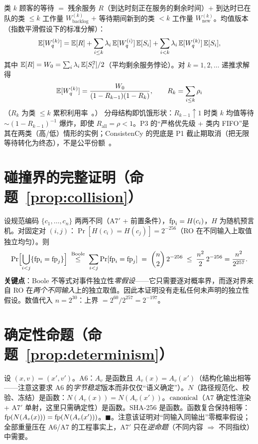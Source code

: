类 $k$ 顾客的等待 $=$ 残余服务 $R$（到达时刻正在服务的剩余时间）$+$ 到达时已在队的类 $\le k$ 工作量 $W_{\text{backlog}}^{(k)}$ $+$ 等待期间新到的类 $<k$ 工作量 $W_{\text{new}}^{(k)}$。均值版本（指数平滑假设下的标准分解）：
\begin{equation}
\operatorname{\mathbb{E}}[W_q^{(k)}]=\operatorname{\mathbb{E}}[R]+\sum_{i\le k}\lambda_i\operatorname{\mathbb{E}}[W_q^{(i)}]\operatorname{\mathbb{E}}[S_i]+\sum_{i<k}\lambda_i\operatorname{\mathbb{E}}[W_q^{(k)}]\operatorname{\mathbb{E}}[S_i],
\end{equation}
其中 $\operatorname{\mathbb{E}}[R]=W_0=\sum_i\lambda_i\operatorname{\mathbb{E}}[S_i^2]/2$（平均剩余服务悖论）。对 $k=1,2,\dots$ 递推求解得
\begin{equation}
\operatorname{\mathbb{E}}[W_q^{(k)}]=\frac{W_0}{(1-R_{k-1})(1-R_k)},\qquad R_k=\sum_{i\le k}\rho_i
\end{equation}
（$R_k$ 为类 $\le k$ 累积利用率~\cite{kleinrock1975}。）
分母结构即饥饿形状：$R_{k-1}\uparrow1$ 时类 $k$ 均值等待 $\sim(1-R_{k-1})^{-1}$ 爆炸，即使 $R_\text{all}=\rho<1$。P3 的“严格优先级 + 类内 FIFO”是其在两类（高/低）情形的实例；ConsistenCy 的兜底是 P1 截止期取消（把无限等待转化为终态），不是公平份额~\cite{demers1989}。

\section{碰撞界的完整证明（命题~\ref{prop:collision}）}

设规范编码 $\{c_1,\dots,c_n\}$ 两两不同（A7$'$ + 前置条件），$\operatorname{fp}_i=H(c_i)$，$H$ 为随机预言机。对固定对 $(i,j)$：$\Pr[H(c_i)=H(c_j)]=2^{-256}$（RO 在不同输入上取值独立均匀）。则
\begin{equation}
\Pr\Bigl[\bigcup_{i<j}\{\operatorname{fp}_i=\operatorname{fp}_j\}\Bigr]\;\overset{\text{Boole}}{\le}\;\sum_{i<j}\Pr[\operatorname{fp}_i=\operatorname{fp}_j]\;=\;\binom{n}{2}\,2^{-256}\;\le\;\frac{n^2}{2}\,2^{-256}=\frac{n^2}{2^{257}}.
\end{equation}
\textbf{关键点}：Boole 不等式对事件独立性\emph{零假设}——它只需要逐对概率界，而逐对界来自 RO 在\emph{两个不同输入}上的独立取值。因此本证明没有走私任何未声明的独立性假设。数值代入 $n=2^{30}$：上界 $=2^{60}/2^{257}=2^{-197}$。

\section{确定性命题（命题~\ref{prop:determinism}）}

设 $(x,v)=(x',v')$。A6：$A_v$ 是函数且 $A_v(x)=A_v(x')$（结构化输出相等——注意这要求 A6 的\emph{字节稳定}版本而非仅仅“语义确定”）。$N$（路径规范化、校验、冻结）是函数：$N(A_v(x))=N(A_v(x'))$。$\operatorname{canonical}$（A7 确定性渲染 + A7$'$ 单射，这里只需确定性）是函数。SHA-256 是函数。函数复合保持相等：$\operatorname{fp}(N(A_v(x)))=\operatorname{fp}(N(A_v(x')))$。$\blacksquare$。注意该证明对“同输入同输出”零概率假设；全部重量压在 A6/A7 的工程事实上，A7$'$ 只在\emph{逆命题}（不同内容 $\Rightarrow$ 不同指纹）中需要。

